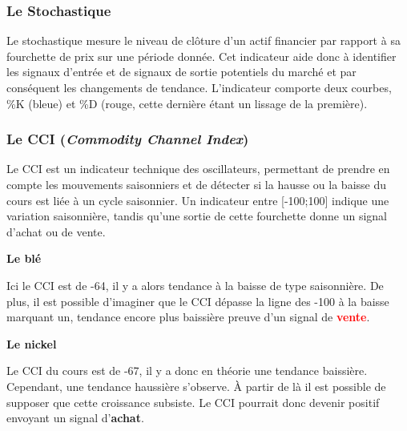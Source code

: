 \subsubsection*{Le Stochastique}
Le stochastique mesure le niveau de clôture d'un actif financier par rapport à sa fourchette de prix sur une période donnée. Cet indicateur aide donc à identifier les 
signaux d'entrée et de signaux de sortie potentiels du marché et par conséquent les changements de tendance. L'indicateur comporte deux courbes, \%K (bleue) et \%D (rouge, 
cette dernière étant un lissage de la première).

\subsubsection*{Le CCI (\textit{Commodity Channel Index})}
Le CCI est un indicateur technique des oscillateurs, permettant de prendre en compte les mouvements saisonniers et de détecter si la hausse ou la baisse du cours est liée 
à un cycle saisonnier. Un indicateur entre [-100;100] indique une variation saisonnière, tandis qu'une sortie de cette fourchette donne un signal d'achat ou de vente.
\begin{multicols}{2}
\centerline{\textbf{Le blé}}
Ici le CCI est de -64, il y a alors tendance à la baisse de type saisonnière. De plus, il est possible d'imaginer que le CCI dépasse la ligne des -100 à la baisse marquant 
un, tendance encore plus baissière preuve d'un signal de \textcolor{red}{\textbf{vente}}.

\columnbreak
\centerline{\textbf{Le nickel}}
Le CCI du cours est de -67, il y a donc en théorie une tendance baissière. Cependant,  une tendance haussière s'observe. À partir de là il est possible de supposer que cette croissance subsiste. Le CCI pourrait donc devenir positif envoyant un signal d'\textcolor{OliveGreen}{\textbf{achat}}.
\end{multicols}

